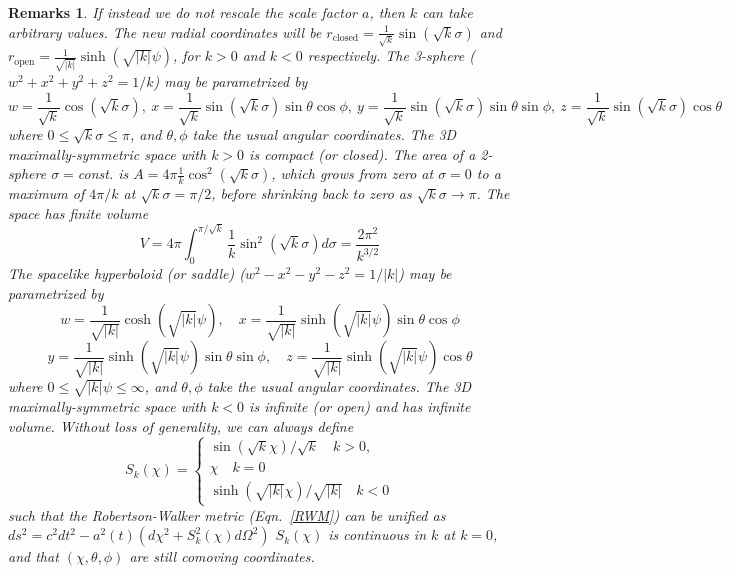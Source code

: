\documentclass[a4paper]{article}
\newtheorem{remarks}{Remarks}[section]
\theoremstyle{new}
\begin{document}
\begin{remarks}
If instead we do not rescale the scale factor $a$, then $k$ can take arbitrary values. The new radial coordinates will be $r_{\text{closed}}=\frac{1}{\sqrt{k}}\sin(\sqrt{k}\sigma)$ and $r_{\text{open}}=\frac{1}{\sqrt{|k|}}\sinh(\sqrt{|k|}\psi)$, for $k>0$ and $k<0$ respectively. The 3-sphere ($w^2+x^2+y^2+z^2=1/k$) may be parametrized by
$$w=\frac{1}{\sqrt{k}}\cos(\sqrt{k}\sigma),~x=\frac{1}{\sqrt{k}}\sin(\sqrt{k}\sigma)\sin\theta\cos\phi,~y=\frac{1}{\sqrt{k}}\sin(\sqrt{k}\sigma)\sin\theta\sin\phi,~z=\frac{1}{\sqrt{k}}\sin(\sqrt{k}\sigma)\cos\theta$$
where $0\leq\sqrt{k}\sigma\leq \pi$, and $\theta,\phi$ take the usual angular coordinates. The 3D maximally-symmetric space with $k>0$ is compact (or closed). The area of a 2-sphere $\sigma=$const. is $A=4\pi\frac{1}{k}\cos^2(\sqrt{k}\sigma)$, which grows from zero at $\sigma=0$ to a maximum of $4\pi/k$ at $\sqrt{k}\sigma=\pi/2$, before shrinking back to zero as $\sqrt{k}\sigma\rightarrow\pi$. The space has finite volume
$$V=4\pi\int_0^{\pi/\sqrt{k}}\frac{1}{k}\sin^2(\sqrt{k}\sigma)d\sigma=\frac{2\pi^2}{k^{3/2}}$$
The spacelike hyperboloid (or saddle)  ($w^2-x^2-y^2-z^2=1/|k|$) may be parametrized by
$$w=\frac{1}{\sqrt{|k|}}\cosh(\sqrt{|k|}\psi),\quad x=\frac{1}{\sqrt{|k|}}\sinh(\sqrt{|k|}\psi)\sin\theta\cos\phi$$
$$y=\frac{1}{\sqrt{|k|}}\sinh(\sqrt{|k|}\psi)\sin\theta\sin\phi,\quad z=\frac{1}{\sqrt{|k|}}\sinh(\sqrt{|k|}\psi)\cos\theta$$
where $0\leq\sqrt{|k|}\psi\leq \infty$, and $\theta,\phi$ take the usual angular coordinates. The 3D maximally-symmetric space with $k<0$ is infinite (or open) and has infinite volume. Without loss of generality, we can always define 
$$S_k(\chi)= \begin{cases} \sin(\sqrt{k}\chi)/\sqrt{k}\quad k>0,\\
\chi\quad k=0\\
\sinh(\sqrt{|k|}\chi)/\sqrt{|k|}\quad k<0
\end{cases}$$
such that the Robertson-Walker metric (Eqn.~\ref{RWM}) can be unified as $ds^2=c^2dt^2-a^2(t)(d\chi^2+S_k^2(\chi) d\Omega^2)$ $S_k(\chi)$ is continuous in $k$ at $k=0$, and that $(\chi,\theta,\phi)$ are still comoving coordinates.
\end{remarks}
\newpage
\end{document}
